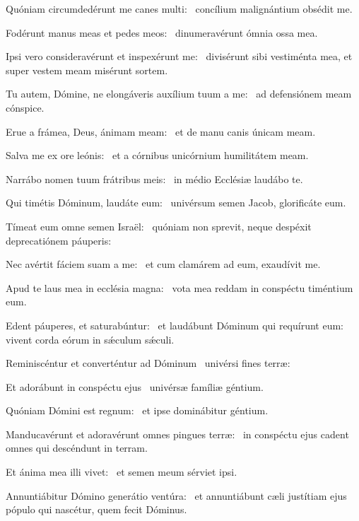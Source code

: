 \item Quóniam circumdedérunt me canes multi:~\psstar{} concílium malignántium obsédit me.

\item Fodérunt manus meas et pedes meos:~\psstar{} dinumeravérunt ómnia ossa mea.

\item Ipsi vero consideravérunt et inspexérunt me:~\psstar{} divisérunt sibi vestiménta mea, et super vestem meam misérunt sortem.

\item Tu autem, Dómine, ne elongáveris auxílium tuum a me:~\psstar{} ad defensiónem meam cónspice.

\item Erue a frámea, Deus, ánimam meam:~\psstar{} et de manu canis únicam meam.

\item Salva me ex ore leónis:~\psstar{} et a córnibus unicórnium humilitátem meam.

\item Narrábo nomen tuum frátribus meis:~\psstar{} in médio Ecclésiæ laudábo te.

\item Qui timétis Dóminum, laudáte eum:~\psstar{} univérsum semen Jacob, glorificáte eum.

\item Tímeat eum omne semen Israël:~\psstar{} quóniam non sprevit, neque despéxit deprecatiónem páuperis:

\item Nec avértit fáciem suam a me:~\psstar{} et cum clamárem ad eum, exaudívit me.

\item Apud te laus mea in ecclésia magna:~\psstar{} vota mea reddam in conspéctu timéntium eum.

\item Edent páuperes, et saturabúntur:~\pscross{} et laudábunt Dóminum qui requírunt eum:~\psstar{} vivent corda eórum in sǽculum sǽculi.

\item Reminiscéntur et converténtur ad Dóminum~\psstar{} univérsi fines terræ:

\item Et adorábunt in conspéctu ejus~\psstar{} univérsæ famíliæ géntium.

\item Quóniam Dómini est regnum:~\psstar{} et ipse dominábitur géntium.

\item Manducavérunt et adoravérunt omnes pingues terræ:~\psstar{} in conspéctu ejus cadent omnes qui descéndunt in terram.

\item Et ánima mea illi vivet:~\psstar{} et semen meum sérviet ipsi.

\item Annuntiábitur Dómino generátio ventúra:~\psstar{} et annuntiábunt cæli justítiam ejus pópulo qui nascétur, quem fecit Dóminus.

